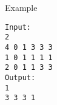 Example
\begin{verbatim}
Input:
2
4 0 1 3 3 3
1 0 1 1 1 1
2 0 1 1 3 3
Output:
1
3 3 3 1
\end{verbatim}